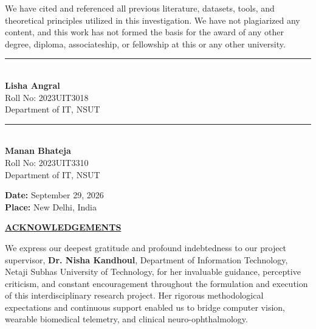 \documentclass[12pt,a4paper,oneside]{report}
\begin{document}
\vspace{0.5cm}
\noindent We have cited and referenced all previous literature, datasets, tools, and theoretical principles utilized in this investigation. We have not plagiarized any content, and this work has not formed the basis for the award of any other degree, diploma, associateship, or fellowship at this or any other university.

\vspace{2.2cm}
\noindent
\begin{minipage}[t]{0.45\textwidth}
    \centering
    \rule{5.5cm}{0.4pt}\\[0.15cm]
    \textbf{Lisha Angral}\\
    Roll No: 2023UIT3018\\
    Department of IT, NSUT
\end{minipage}
\hfill
\begin{minipage}[t]{0.45\textwidth}
    \centering
    \rule{5.5cm}{0.4pt}\\[0.15cm]
    \textbf{Manan Bhateja}\\
    Roll No: 2023UIT3310\\
    Department of IT, NSUT
\end{minipage}

\vspace{1.5cm}
\noindent \textbf{Date:} September 29, 2026\\
\textbf{Place:} New Delhi, India

\cleardoublepage
\thispagestyle{plain}
\begin{center}
    {\large\bfseries\underline{ACKNOWLEDGEMENTS}\par}
\end{center}

\vspace{0.8cm}
\noindent We express our deepest gratitude and profound indebtedness to our project supervisor, \textbf{Dr. Nisha Kandhoul}, Department of Information Technology, Netaji Subhas University of Technology, for her invaluable guidance, perceptive criticism, and constant encouragement throughout the formulation and execution of this interdisciplinary research project. Her rigorous methodological expectations and continuous support enabled us to bridge computer vision, wearable biomedical telemetry, and clinical neuro-ophthalmology.
\end{document}
